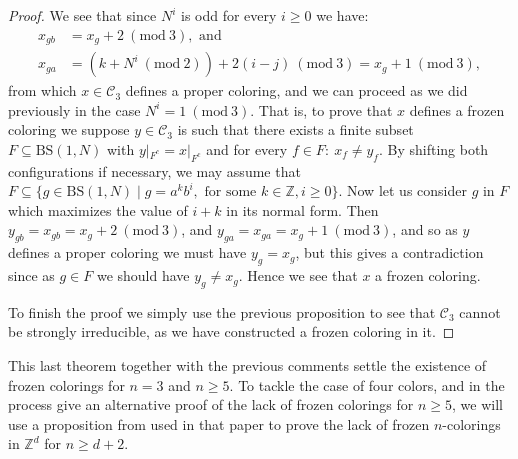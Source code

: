 \documentclass{aims}
\newcommand{\BS}[1][N]{\mathrm{BS}(1,#1)}
\theoremstyle{definition}
\begin{document}
\begin{proof}
	
	
	We see that since $N^i$ is odd for every $i\ge 0$ we have:
	\begin{align*}
	x_{gb}&=x_g+2\ (\mathrm{mod} \ 3), \text{ and} \\
	x_{ga}&=(k+N^i \ (\mathrm{mod} \ 2)) + 2(i-j) \ (\mathrm{mod} \ 3)=x_g+1 \ (\mathrm{mod} \ 3),
	\end{align*}
	from which $x\in \mathcal{C}_3$ defines a proper coloring, and we can proceed as we did previously in the case $N^i=1\ (\mathrm{mod} \ 3)$. That is, to prove that $x$ defines a frozen coloring we suppose $y\in \mathcal{C}_3$ is such that there exists a finite subset $F\subseteq \BS$ with $y|_{F^ c}=x|_{F^c}$ and for every $f\in F: \ x_f\neq y_f$. By shifting both configurations if necessary, we may assume that $F\subseteq \{g\in \BS\mid g=a^kb^i, \text{ for some }k\in \mathbb{Z}, i\ge 0\}$. Now let us consider $g$ in $F$ which maximizes the value of $i+k$ in its normal form. Then $y_{gb}=x_{gb}=x_g+2\ (\mathrm{mod} \ 3)$, and $y_{ga}=x_{ga}=x_g+1\ (\mathrm{mod} \ 3)$, and so as $y$ defines a proper coloring we must have $y_g=x_g$, but this gives a contradiction since as $g\in F$ we should have $y_g\neq x_g$. Hence we see that $x$ a frozen coloring.
	
	To finish the proof we simply use the previous proposition to see that $\mathcal{C}_3$ cannot be strongly irreducible, as we have constructed a frozen coloring in it.
\end{proof}

This last theorem together with the previous comments settle the existence of frozen colorings for $n=3$ and $n\ge 5$. To tackle the case of four colors, and in the process give an alternative proof of the lack of frozen colorings for $n\ge 5$, we will use a proposition from \cite{alon2019mixing} used in that paper to prove the lack of frozen $n$-colorings in $\mathbb{Z}^d$ for $n\ge d+2$.
\end{document}
